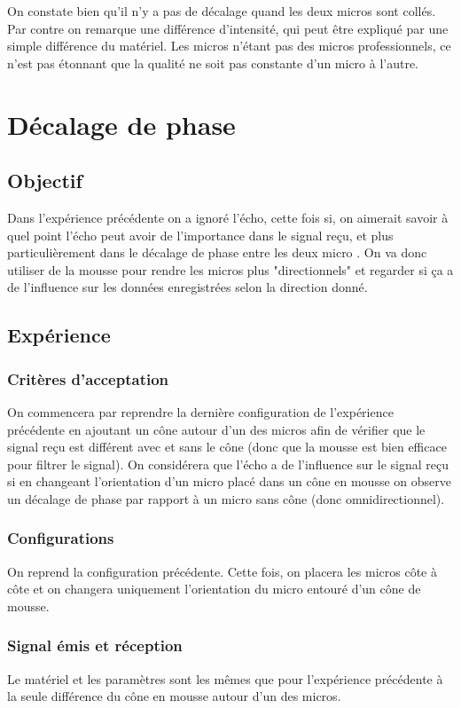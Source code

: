 \documentclass[12pt,a4paper]{report}
\begin{document}
On constate bien qu'il n'y a pas de décalage quand les deux micros sont collés. Par contre on remarque une différence d'intensité, qui peut être expliqué par une simple différence du matériel. Les micros n'étant pas des micros professionnels, ce n'est pas étonnant que la qualité ne soit pas constante d'un micro à l'autre.


\chapter{Décalage de phase}
\section{Objectif}
Dans l'expérience précédente on a ignoré l'écho, cette fois si, on aimerait savoir à quel point l'écho peut avoir de l'importance dans le signal reçu, et plus particulièrement dans le décalage de phase entre les deux micro .
On va donc utiliser de la mousse pour rendre les micros plus "directionnels" et regarder si ça a de l'influence sur les données enregistrées selon la direction donné.

\section{Expérience}
\subsection{Critères d'acceptation}
On commencera par reprendre la dernière configuration de l'expérience précédente en ajoutant un cône autour d'un des micros afin de vérifier que le signal reçu est différent avec et sans le cône (donc que la mousse est bien efficace pour filtrer le signal).
On considérera que l'écho a de l'influence sur le signal reçu si en changeant l'orientation d'un micro placé dans un cône en mousse on observe un décalage de phase par rapport à un micro sans cône (donc omnidirectionnel).

\subsection{Configurations}
On reprend la configuration précédente. Cette fois, on placera les micros côte à côte et on changera uniquement l'orientation  du micro entouré d'un cône de mousse.

\subsection{Signal émis et réception}
Le matériel et les paramètres sont les mêmes que pour l'expérience précédente à la seule différence du cône en mousse autour d'un des micros.
\end{document}
